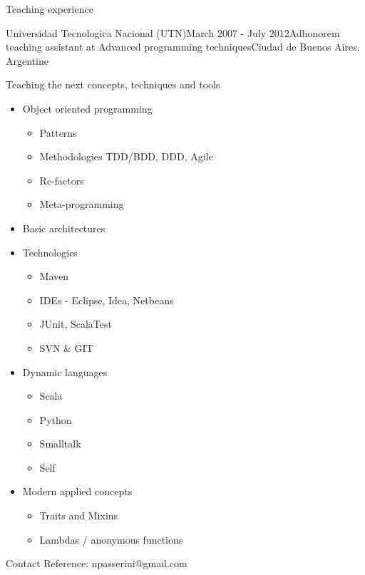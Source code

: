 \documentclass{resume} %
\begin{document}

\begin{rSection}{Teaching experience}


\begin{rSubsection}{Universidad Tecnologica Nacional (UTN)}{March 2007 - July 2012}{Adhonorem teaching assistant at Advanced programming techniques}{Ciudad de Buenos Aires, Argentine}
\item Teaching the next concepts, techniques and tools
\begin{itemize}
	\item Object oriented programming
	\begin{itemize}
		\item Patterns
		\item Methodologies TDD/BDD, DDD, Agile
		\item Re-factors
		\item Meta-programming
	\end{itemize}
	\item Basic architectures
	\item Technologies
	\begin{itemize}
		\item Maven 
		\item IDEs - Eclipse, Idea, Netbeans
		\item JUnit, ScalaTest
		\item SVN \& GIT
	\end{itemize}
	\item Dynamic languages 
	\begin{itemize}
		\item  Scala
		\item  Python
		\item  Smalltalk
		\item  Self
	\end{itemize}
	\item Modern applied concepts
	\begin{itemize}
		\item Traits and Mixins
		\item  Lambdas / anonymous functions
	\end{itemize}
\end{itemize}
\item Contact Reference: npasserini@gmail.com
\end{rSubsection}


\end{rSection}
\end{document}
